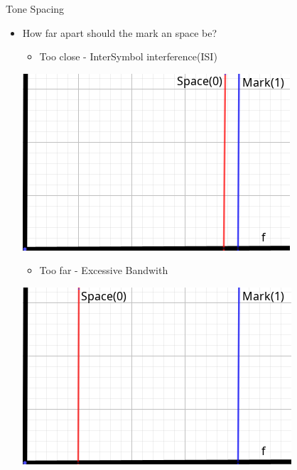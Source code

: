 \documentclass{beamer}
\begin{document}
	\begin{frame}{Tone Spacing}
		\begin{itemize}
			\onslide\item<1-> How far apart should the mark an space be?
			\begin{flushleft} 
				\begin{itemize}
					\item Too close - InterSymbol interference(ISI)
				\end{itemize}
				
			\end{flushleft}
			
			\centering
			\includegraphics[scale=0.4]{13.png} 
			
			\begin{flushleft} 
				\begin{itemize}
					\onslide\item Too far - Excessive Bandwith  
				\end{itemize}
				
			\end{flushleft}
			
			\begin{center}
				\includegraphics[scale=0.4]{12.png}
			\end{center}
			
		\end{itemize}
	\end{frame}
	
\end{document}
